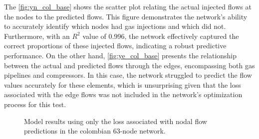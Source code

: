 The \cref{fig:yn_col_base} shows the scatter plot relating the actual injected flows at the nodes to the predicted flows. This figure demonstrates the network's ability to accurately identify which nodes had gas injections and which did not. Furthermore, with an $R^2$ value of 0.996, the network effectively captured the correct proportions of these injected flows, indicating a robust predictive performance. 
On the other hand, \cref{fig:ye_col_base} presents the relationship between the actual and predicted flows through the edges, encompassing both gas pipelines and compressors. In this case, the network struggled to predict the flow values accurately for these elements, which is unsurprising given that the loss associated with the edge flows was not included in the network's optimization process for this test.

\begin{figure}
    \centering
        \setlength{}        
        \setlength{} 
    \caption{Model results using only the loss associated with nodal flow predictions in the colombian 63-node network.}\label{fig:colombian_base_results}
\end{figure}

%
%
%
%
%


